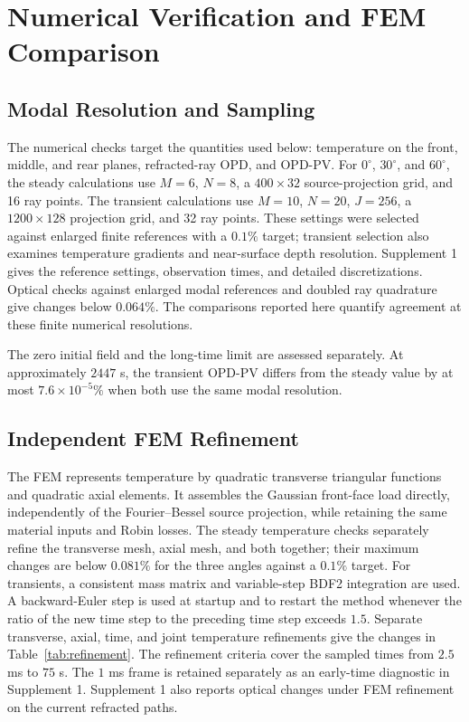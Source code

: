 \documentclass{optica-article}
\begin{document}
\section{Numerical Verification and FEM Comparison}
\subsection{Modal Resolution and Sampling}
The numerical checks target the quantities used below: temperature on the front, middle, and rear planes, refracted-ray OPD, and OPD-PV.
For $0^\circ$, $30^\circ$, and $60^\circ$, the steady calculations use $M=6$, $N=8$, a $400\times32$ source-projection grid, and 16 ray points.
The transient calculations use $M=10$, $N=20$, $J=256$, a $1200\times128$ projection grid, and 32 ray points.
These settings were selected against enlarged finite references with a $0.1\%$ target; transient selection also examines temperature gradients and near-surface depth resolution.
Supplement 1 gives the reference settings, observation times, and detailed discretizations.
Optical checks against enlarged modal references and doubled ray quadrature give changes below $0.064\%$.
The comparisons reported here quantify agreement at these finite numerical resolutions.

The zero initial field and the long-time limit are assessed separately.
At approximately $2447$ s, the transient OPD-PV differs from the steady value by at most $7.6\times10^{-5}\%$ when both use the same modal resolution.

\subsection{Independent FEM Refinement}
The FEM represents temperature by quadratic transverse triangular functions and quadratic axial elements.
It assembles the Gaussian front-face load directly, independently of the Fourier--Bessel source projection, while retaining the same material inputs and Robin losses.
The steady temperature checks separately refine the transverse mesh, axial mesh, and both together; their maximum changes are below $0.081\%$ for the three angles against a $0.1\%$ target.
For transients, a consistent mass matrix and variable-step BDF2 integration are used.
A backward-Euler step is used at startup and to restart the method whenever the ratio of the new time step to the preceding time step exceeds $1.5$.
Separate transverse, axial, time, and joint temperature refinements give the changes in Table~\ref{tab:refinement}.
The refinement criteria cover the sampled times from $2.5$ ms to $75$ s.
The $1$ ms frame is retained separately as an early-time diagnostic in Supplement 1.
Supplement 1 also reports optical changes under FEM refinement on the current refracted paths.
\end{document}
